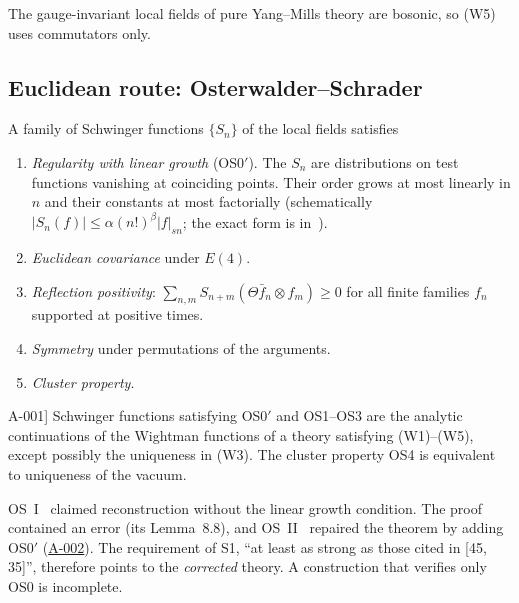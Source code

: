 \documentclass[11pt,a4paper]{article}
\newcommand{\idref}[1]{\hyperref[#1]{\textsf{#1}}}
\begin{document}
The gauge-invariant local fields of pure Yang--Mills theory are bosonic, so (W5) uses commutators only.

\subsection{Euclidean route: Osterwalder--Schrader}

\begin{definition}\label{def:os}
A family of Schwinger functions $\{S_n\}$ of the local fields satisfies
\begin{enumerate}[label=\textup{(OS\arabic*)},start=0,leftmargin=3.2em]
\item \emph{Regularity with linear growth} (OS0$'$). The $S_n$ are distributions on test functions vanishing at coinciding points. Their order grows at most linearly in $n$ and their constants at most factorially (schematically $|S_n(f)|\le\alpha(n!)^\beta|f|_{sn}$; the exact form is in~\cite{OS75}).
\item \emph{Euclidean covariance} under $E(4)$.
\item \emph{Reflection positivity}: $\sum_{n,m}S_{n+m}(\Theta\bar f_n\otimes f_m)\ge0$ for all finite families $f_n$ supported at positive times.
\item \emph{Symmetry} under permutations of the arguments.
\item \emph{Cluster property}.
\end{enumerate}
\end{definition}

\begin{importedtheorem}[OS reconstruction; \idref{A-001}]\label{thm:os}
Schwinger functions satisfying OS0$'$ and OS1--OS3 are the analytic continuations of the Wightman functions of a theory satisfying (W1)--(W5), except possibly the uniqueness in (W3). The cluster property OS4 is equivalent to uniqueness of the vacuum.
\end{importedtheorem}

\begin{remark}
OS~I~\cite{OS73} claimed reconstruction without the linear growth condition. The proof contained an error (its Lemma~8.8), and OS~II~\cite{OS75} repaired the theorem by adding OS0$'$ (\idref{A-002}). The requirement of S1, \enquote{at least as strong as those cited in [45, 35]}, therefore points to the \emph{corrected} theory. A construction that verifies only OS0 is incomplete.
\end{remark}
\end{document}
